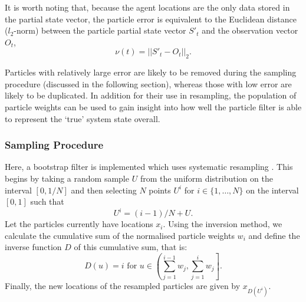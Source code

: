 It is worth noting that, because the agent locations are the only data stored in the partial state vector, the particle error is equivalent to the Euclidean distance ($l_2$-norm) between the particle partial state vector $S'_{t}$ and the observation vector $O_t$,
\begin{equation}
 \nu(t) = || S'_{t} - O_t  ||_2.
\end{equation} 

Particles with relatively large error are likely to be removed during the sampling procedure (discussed in the following section), whereas those with low error are likely to be duplicated. In addition for their use in resampling, the population of particle weights can be used to gain insight into how well the particle filter is able to represent the `true' system state overall. 

\subsubsection{Sampling Procedure\label{particle_sampling}}

Here, a bootstrap filter is implemented which uses systematic resampling \citep{doucet_introduction_2001, douc_comparison_2005, wang_data_2015, long_spatial_2017, carrassi_data_2018}. This begins by taking a random sample $U$ from the uniform distribution on the interval $[0,1/N]$ and then selecting $N$ points $U^i$ for $i \in \{1,\dots,N\}$ on the interval $[0,1]$ such that
\begin{equation}
U^i = (i-1)/N + U.
\end{equation}
Let the particles currently have locations $x_i$. Using the inversion method, we calculate the cumulative sum of the normalised particle weights $w_i$ and define the inverse function $D$ of this cumulative sum, that is:
\begin{equation}
D(u) = i \text{ for } u \in \left(\sum_{j=1}^{i-1}w_j,\sum_{j=1}^{i}w_j\right].
\end{equation}
Finally, the new locations of the resampled particles are given by $x_{D(U^i)}$.

